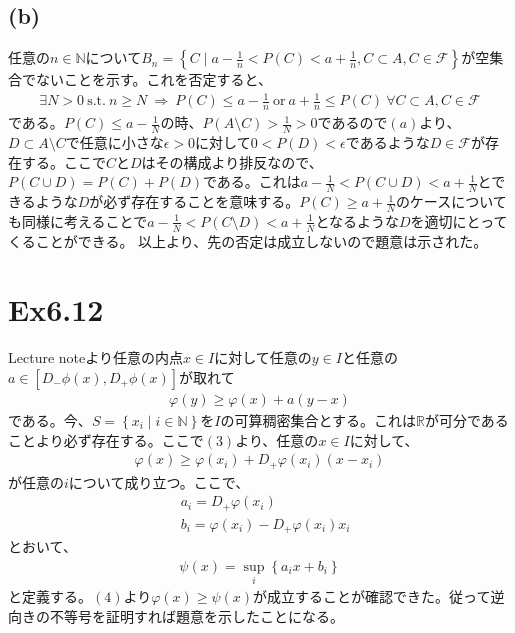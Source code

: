 \documentclass{article}
\begin{document}
\subsection{(b)}
任意の$n \in \mathbb{N}$について$B_n = \left\{ C \mid a - \frac{1}{n} < P(C) < a + \frac{1}{n}, C \subset A, C \in \mathcal{F}\right\}$が空集合でないことを示す。これを否定すると、
\begin{align*}
	\exists N > 0\ \text{s.t.}\ n \geq N\ \Rightarrow\ P(C) \leq a - \frac{1}{n}\ \text{or}\ a + \frac{1}{n} \leq P(C)\ \forall C \subset A, C \in \mathcal{F}
\end{align*}
である。$P(C) \leq a - \frac{1}{N}$の時、$P(A \setminus C) > \frac{1}{N} > 0$であるので$(a)$より、$D \subset A \setminus C$で任意に小さな$\epsilon > 0$に対して$0 < P(D) < \epsilon$であるような$D \in \mathcal{F}$が存在する。ここで$C$と$D$はその構成より排反なので、$P(C \cup D) = P(C) + P(D)$である。これは$a - \frac{1}{N} < P(C\cup D) < a + \frac{1}{N}$とできるような$D$が必ず存在することを意味する。$P(C) \geq a + \frac{1}{N}$のケースについても同様に考えることで$a - \frac{1}{N} < P(C\setminus D) < a + \frac{1}{N}$となるような$D$を適切にとってくることができる。
以上より、先の否定は成立しないので題意は示された。

\section{Ex6.12}
Lecture noteより任意の内点$x \in I$に対して任意の$y \in I$と任意の$a \in \left[ D_{-}\phi(x), D_{+}\phi(x) \right]$が取れて
\begin{align}
	\varphi(y) \geq \varphi(x) + a(y-x)
\end{align}
である。今、$S = \left\{ x_i \mid i \in \mathbb{N} \right\}$を$I$の可算稠密集合とする。これは$\mathbb{R}$が可分であることより必ず存在する。ここで$(3)$より、任意の$x\in I$に対して、
\begin{align}
	\varphi(x) \geq \varphi(x_i) + D_{+}\varphi(x_i) (x - x_i)
\end{align}
が任意の$i$について成り立つ。ここで、
\begin{align*}
	&a_i = D_{+}\varphi(x_i)\\
	&b_i = \varphi(x_i) - D_{+}\varphi(x_i) x_i
\end{align*}
とおいて、
\begin{align*}
	\psi(x) = \sup_i \left\{ a_i x + b_i \right\}
\end{align*}
と定義する。$(4)$より$\varphi(x) \geq \psi(x)$が成立することが確認できた。従って逆向きの不等号を証明すれば題意を示したことになる。
\end{document}
